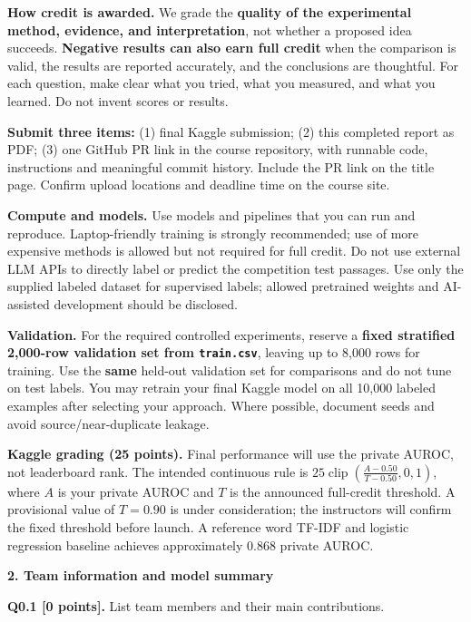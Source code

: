 \documentclass[11pt,letterpaper]{article}
\begin{document}
\textbf{How credit is awarded.} We grade the \textbf{quality of the experimental method, evidence, and interpretation}, not whether a proposed idea succeeds. \textbf{Negative results can also earn full credit} when the comparison is valid, the results are reported accurately, and the conclusions are thoughtful. For each question, make clear what you tried, what you measured, and what you learned. Do not invent scores or results.

\textbf{Submit three items:} (1) final Kaggle submission; (2) this completed report as PDF; (3) one GitHub PR link in the course repository, with runnable code, instructions and meaningful commit history. Include the PR link on the title page. Confirm upload locations and deadline time on the course site.

\textbf{Compute and models.} Use models and pipelines that you can run and reproduce. Laptop-friendly training is strongly recommended; use of more expensive methods is allowed but not required for full credit. Do not use external LLM APIs to directly label or predict the competition test passages. Use only the supplied labeled dataset for supervised labels; allowed pretrained weights and AI-assisted development should be disclosed.

\textbf{Validation.} For the required controlled experiments, reserve a \textbf{fixed stratified 2,000-row validation set from \texttt{train.csv}}, leaving up to 8,000 rows for training. Use the \textbf{same} held-out validation set for comparisons and do not tune on test labels. You may retrain your final Kaggle model on all 10,000 labeled examples after selecting your approach. Where possible, document seeds and avoid source/near-duplicate leakage.

\textbf{Kaggle grading (25 points).} Final performance will use the private AUROC, not leaderboard rank. The intended continuous rule is $25\operatorname{clip}\left(\frac{A - 0.50}{T - 0.50}, 0, 1\right)$, where $A$ is your private AUROC and $T$ is the announced full-credit threshold. A provisional value of $T = 0.90$ is under consideration; the instructors will confirm the fixed threshold before launch. A reference word TF-IDF and logistic regression baseline achieves approximately 0.868 private AUROC.

\vspace{10pt}
{\large\textbf{2. Team information and model summary}}
\vspace{4pt}

\textbf{Q0.1 [0 points].} List team members and their main contributions.
\end{document}
